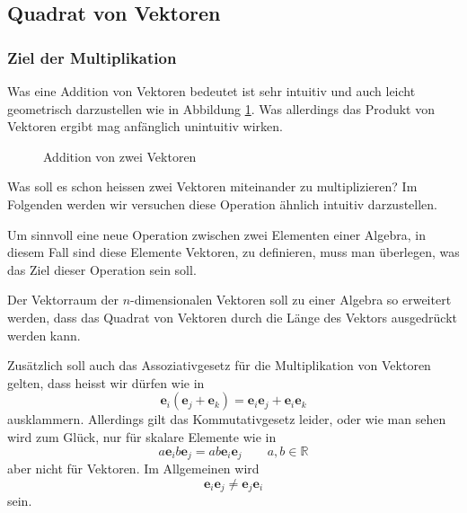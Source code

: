 \subsection{Quadrat von Vektoren}
\subsubsection{Ziel der Multiplikation}
Was eine Addition von Vektoren bedeutet ist sehr intuitiv und auch leicht geometrisch darzustellen wie in Abbildung \ref{figure:addition}. Was allerdings das Produkt von Vektoren ergibt mag anfänglich unintuitiv wirken.
\begin{figure}[tb]
	\centering
		\caption{Addition von zwei Vektoren\label{figure:addition}}
\end{figure}
Was soll es schon heissen zwei Vektoren miteinander zu multiplizieren? 
Im Folgenden werden wir versuchen diese Operation ähnlich intuitiv darzustellen.

Um sinnvoll eine neue Operation zwischen zwei Elementen einer Algebra, in diesem Fall sind diese Elemente Vektoren, zu definieren, muss man überlegen, was das Ziel dieser Operation sein soll.
 
\begin{ziel}
	\label{clifford:ziel}
	Der Vektorraum der $n$-dimensionalen Vektoren soll zu einer Algebra so erweitert werden, dass das Quadrat von Vektoren durch die Länge des Vektors ausgedrückt werden kann.
\end{ziel}
Zusätzlich soll auch das Assoziativgesetz für die Multiplikation von Vektoren gelten, dass heisst wir dürfen wie in
\begin{equation}
    \label{eq:assoziativ}
    \textbf{e}_i(\textbf{e}_j + \textbf{e}_k) 
    = 
    \textbf{e}_i\textbf{e}_j + \textbf{e}_i\textbf{e}_k
\end{equation}
ausklammern.
Allerdings gilt das Kommutativgesetz leider, oder wie man sehen wird zum Glück, nur für skalare Elemente wie in
\begin{equation}
    \label{eq:kommSkalar}
    a\textbf{e}_ib\textbf{e}_j 
    = 
    ab\textbf{e}_i\textbf{e}_j \qquad a,b \in \mathbb{R}
\end{equation}
aber nicht für Vektoren. Im Allgemeinen wird
\begin{equation}
    \label{eq:kommVector}
    \textbf{e}_i\textbf{e}_j 
    \neq 
    \textbf{e}_j\textbf{e}_i
\end{equation}
sein.
